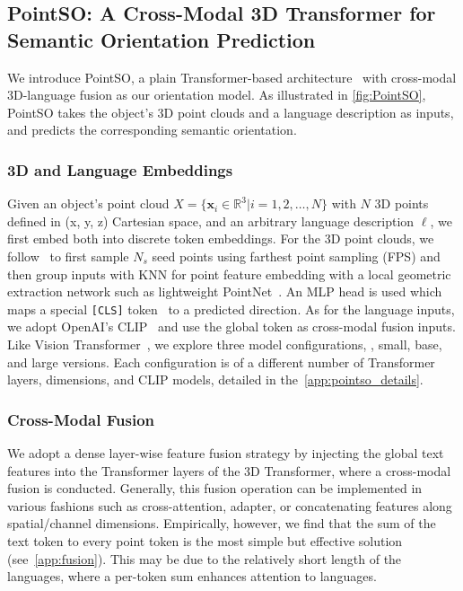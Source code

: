\subsection{PointSO: A Cross-Modal 3D Transformer for Semantic Orientation Prediction}\label{sec:PointSO}
We introduce PointSO, a plain Transformer-based architecture~\cite{AttentionIsAllYouNeed} with cross-modal 3D-language fusion as our orientation model. 
As illustrated in \cref{fig:PointSO}, PointSO takes the object's 3D point clouds and a language description as inputs, and predicts the corresponding semantic orientation.

\subsubsection{3D and Language Embeddings}
Given an object's point cloud $X = \{\mathbf{x}_i \in\mathbb{R}^3|i=1,2,\dots, N\}$ with $N$ 3D points defined in (x, y, z) Cartesian space, and an arbitrary language description $\ell$, we first embed both into discrete token embeddings.
For the 3D point clouds, we follow~\cite{ACT23,PointBERT,ReCon23} to first sample $N_s$ seed points using farthest point sampling (FPS) and then group inputs with KNN for point feature embedding with a local geometric extraction network such as lightweight PointNet~\cite{PointNet,PointNet++}. 
An MLP head is used which maps a special \texttt{[CLS]} token~\cite{ViT} to a predicted direction.
As for the language inputs, we adopt OpenAI's CLIP~\cite{CLIP} and use the global token as cross-modal fusion inputs.
Like Vision Transformer~\cite{ViT}, we explore three model configurations, \ie, small, base, and large versions.
Each configuration is of a different number of Transformer layers, dimensions, and CLIP models, detailed in the~\cref{app:pointso_details}.

\subsubsection{Cross-Modal Fusion}
We adopt a dense layer-wise feature fusion strategy by injecting the global text features into the Transformer layers of the 3D Transformer, where a cross-modal fusion is conducted.
Generally, this fusion operation can be implemented in various fashions such as cross-attention, adapter, or concatenating features along spatial/channel dimensions.
Empirically, however, we find that the sum of the text token to every point token is the most simple but effective solution (see~\cref{app:fusion}).
This may be due to the relatively short length of the languages, where a per-token sum enhances attention to languages. 

